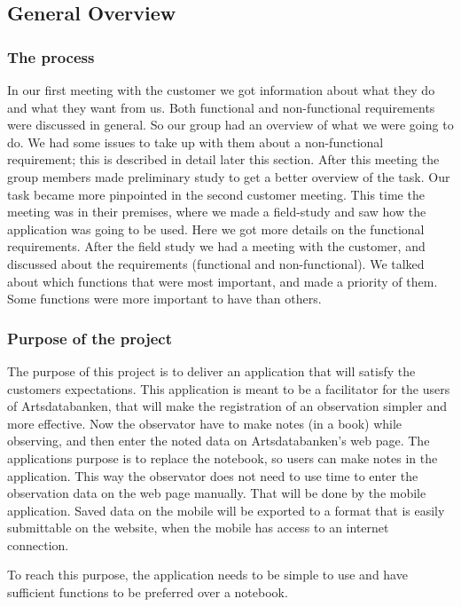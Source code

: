 \subsection{General Overview}

\subsubsection{ The process}
	In our first meeting with the customer we got information about what they do and what they want from us. Both functional and non-functional requirements were discussed in general. So our group had an overview of what we were going to do. We had some issues to take up with them about a non-functional requirement; this is described in detail later this section. After this meeting the group members made preliminary study to get a better overview of the task.
\indent Our task became more pinpointed in the second customer meeting. This time the meeting was in their premises, where we made a field-study and saw how the application was going to be used. Here we got more details on the functional requirements. After the field study we had a meeting with the customer, and discussed about the requirements (functional and non-functional). We talked about which functions that were most important, and made a priority of them. Some functions were more important to have than others.

\subsubsection{Purpose of the project}

The purpose of this project is to deliver an application that will satisfy the customers expectations.  
This application is meant to be a facilitator for the users of Artsdatabanken, that will make the registration of an observation simpler and more effective. Now the observator have to make notes (in a book) while observing, and then enter the noted data on Artsdatabanken's web page. The applications purpose is to replace the notebook, so users can make notes in the application. This way the observator does not need to use time to enter the observation data on the web page manually. That will be done by the mobile application. Saved data on the mobile will be exported to a format that is easily submittable on the website, when the mobile has access to an internet connection.

To reach this purpose, the application needs to be simple to use and have sufficient functions to be preferred over a notebook. 



